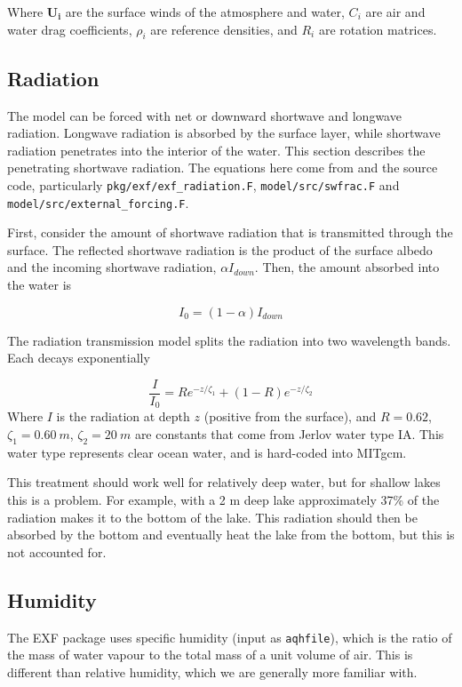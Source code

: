 \documentclass[11pt]{article}
\begin{document}
Where $\mathbf{U_i}$ are the surface winds of the atmosphere and water, $C_i$ are air and water drag coefficients, $\rho_i$ are reference densities, and $R_i$ are rotation matrices.

\subsection{Radiation}
\label{sec:MITgcmRadiation}
The model can be forced with net or downward shortwave and longwave radiation. Longwave radiation is absorbed by the surface layer, while shortwave radiation penetrates into the interior of the water. This section describes the penetrating shortwave radiation. The equations here come from \cite{PaulsonSimpson1977} and the source code, particularly \verb|pkg/exf/exf_radiation.F|, \verb|model/src/swfrac.F| and \verb|model/src/external_forcing.F|.

First, consider the amount of shortwave radiation that is transmitted through the surface. The reflected shortwave radiation is the product of the surface albedo and the incoming shortwave radiation, $\alpha I_{down}$. Then, the amount absorbed into the water is

\begin{equation}
I_0 = (1 - \alpha) I_{down}
\end{equation}

The radiation transmission model \cite{PaulsonSimpson1977} splits the radiation into two wavelength bands. Each decays exponentially

\begin{equation}
\frac{I}{I_0} = R e^{-z/\zeta_1} + (1 - R) e^{-z/\zeta_2}
\end{equation}
Where $I$ is the radiation at depth $z$ (positive from the surface), and $R = 0.62$, $\zeta_1 = \SI{0.60}{m}$, $\zeta_2 = \SI{20}{m}$ are constants that come from Jerlov water type IA. This water type represents clear ocean water, and is hard-coded into MITgcm.

This treatment should work well for relatively deep water, but for shallow lakes this is a problem. For example, with a 2 m deep lake approximately 37\% of the radiation makes it to the bottom of the lake. This radiation should then be absorbed by the bottom and eventually heat the lake from the bottom, but this is not accounted for.

\subsection{Humidity}
The EXF package uses specific humidity (input as \verb|aqhfile|), which is the ratio of the mass of water vapour to the total mass of a unit volume of air. This is different than relative humidity, which we are generally more familiar with.
\end{document}
